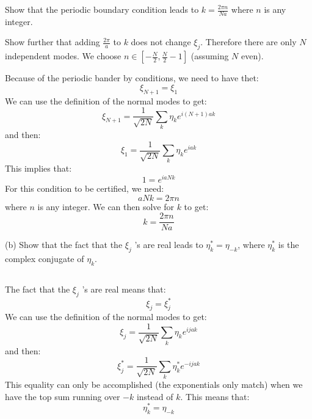 \documentclass[12pt]{article}
\begin{document}
Show that the periodic boundary condition leads to $k=\frac{2 \pi n}{N a}$ where $n$ is any integer.

Show further that adding $\frac{2 \pi}{a}$ to $k$ does not change $\xi_{j}$. Therefore there are only $N$ independent modes. We choose $n \in\left[-\frac{N}{2}, \frac{N}{2}-1\right]$ (assuming $N$ even).

Because of the periodic bander by conditions, we need to have thet:
\begin{equation}
  \xi_{N+1} = \xi_{1}
\end{equation}
We can use the definition of the normal modes to get:
\begin{equation}
  \xi_{N+1} = \frac{1}{\sqrt{2 N}} \sum_{k} \eta_{k} e^{i(N+1) a k}
\end{equation}
and then:
\begin{equation}
  \xi_{1} = \frac{1}{\sqrt{2 N}} \sum_{k} \eta_{k} e^{i a k}
\end{equation}
This implies that:
\begin{equation}
  1 = e^{i a N k}
\end{equation}
For this condition to be certified, we need:
\begin{equation}
  a N k = 2 \pi n
\end{equation}
where $n$ is any integer. We can then solve for $k$ to get:
\begin{equation}
  k = \frac{2 \pi n}{N a}
\end{equation}


(b) Show that the fact that the $\xi_{j}$ 's are real leads to $\eta_{k}^{*}=\eta_{-k}$, where $\eta_{k}^{*}$ is the complex conjugate of $\eta_{k}$.
\subsection{}
The fact that the $\xi_{j}$ 's are real means that:
\begin{equation}
  \xi_{j} = \xi_{j}^{*}
\end{equation}
We can use the definition of the normal modes to get:
\begin{equation}
  \xi_{j} = \frac{1}{\sqrt{2 N}} \sum_{k} \eta_{k} e^{i j a k}
\end{equation}
and then:
\begin{equation}
  \xi_{j}^{*} = \frac{1}{\sqrt{2 N}} \sum_{k} \eta_{k}^{*} e^{-i j a k}
\end{equation}
This equality can only be accomplished (the exponentials only match) when we have the top sum running over $-k$ instead of $k$. This means that:
\begin{equation}
  \eta_{k}^{*} = \eta_{-k}
\end{equation}
\end{document}
